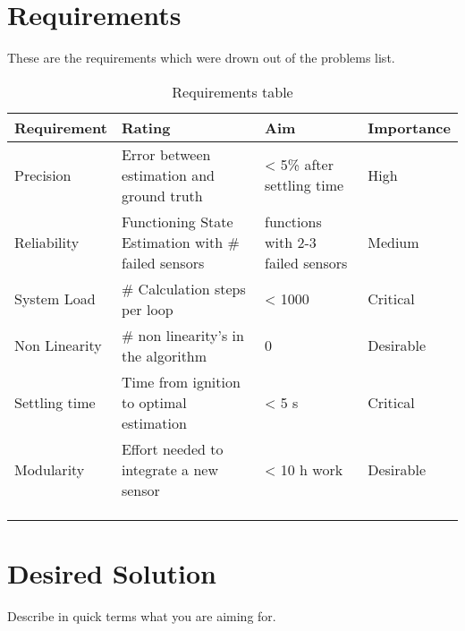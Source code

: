  \cite{}
 
\section{Requirements}
These are the requirements which were drown out of the problems list.
 
 \begin{table}[h]
\centering
\begin{tabular}{|l|l|l|l|}
\hline
\bf{Requirement}   & \bf{Rating} & \bf{Aim} & \bf{Importance} \\ \hline
Precision     & Error between estimation and ground truth  & < 5\% after settling time & High  \\ \hline
Reliability   & Functioning State Estimation with \# failed sensors & functions with 2-3 failed sensors & Medium \\ \hline
System Load   & \# Calculation steps per loop & < 1000 & Critical \\ \hline
Non Linearity & \# non linearity's in the algorithm  & 0 &  Desirable\\ \hline
Settling time & Time from ignition to optimal estimation  & < 5 s       &  Critical\\ \hline
Modularity    & Effort needed to integrate a new sensor    & < 10 h work     &  Desirable\\ \hline
              &                            &            &  \\ \hline
              &                            &            &  \\ \hline
              &                            &            &  \\ \hline
\end{tabular}
\caption{Requirements table}
\label{tab:Requirements}
\end{table}
 
\section{Desired Solution}
 
Describe in quick terms what you are aiming for.